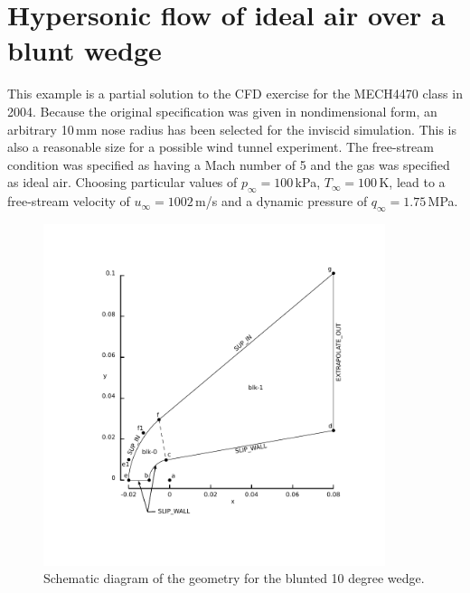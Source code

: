 
\newpage
\section{Hypersonic flow of ideal air over a blunt wedge}
\label{blunt-wedge-sec}
%
This example is a partial solution to the CFD exercise for
the MECH4470 class in 2004.
Because the original specification was given in nondimensional form,
an arbitrary 10\,mm nose radius has been selected for the
inviscid simulation.
This is also a reasonable size for a possible wind tunnel experiment.
The free-stream condition was specified as having a Mach number of 5
and the gas was specified as ideal air.
Choosing particular values of $p_{\infty} = 100$\,kPa, $T_{\infty} = 100$\,K, 
lead to a free-stream velocity of $u_{\infty} = 1002$\,m/s and 
a dynamic pressure of $q_{\infty} = 1.75$\,MPa.

\begin{figure}[htbp]
\begin{center}
\includegraphics[width=10cm,viewport=77 67 398 398,clip=true]{../2D/blunt-wedge/bw-layout.pdf}
\end{center}
\caption{Schematic diagram of the geometry for the blunted 10 degree wedge.}
\label{bw-geometry-fig}
\end{figure}

